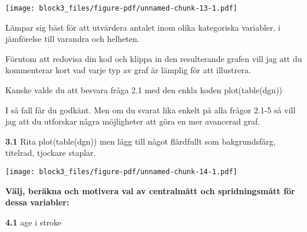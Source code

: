 \documentclass[
  letterpaper,
  DIV=11,
  numbers=noendperiod]{scrartcl}
\newenvironment{Shaded}{\begin{snugshade}}{\end{snugshade}}
\newcommand{\AttributeTok}[1]{\textcolor[rgb]{0.40,0.45,0.13}{#1}}
\newcommand{\CommentTok}[1]{\textcolor[rgb]{0.37,0.37,0.37}{#1}}
\newcommand{\FunctionTok}[1]{\textcolor[rgb]{0.28,0.35,0.67}{#1}}
\newcommand{\NormalTok}[1]{\textcolor[rgb]{0.00,0.23,0.31}{#1}}
\newcommand{\OtherTok}[1]{\textcolor[rgb]{0.00,0.23,0.31}{#1}}
\newcommand{\SpecialCharTok}[1]{\textcolor[rgb]{0.37,0.37,0.37}{#1}}
\newcommand{\StringTok}[1]{\textcolor[rgb]{0.13,0.47,0.30}{#1}}
\begin{document}
\texttt{[image: block3\_files/figure-pdf/unnamed-chunk-13-1.pdf]}

Lämpar sig bäst för att utvärdera antalet inom olika kategoriska
variabler, i jämförelse till varandra och helheten.

Förutom att redovisa din kod och klippa in den resulterande grafen vill
jag att du kommenterar kort vad varje typ av graf är lämplig för att
illustrera.

Kanske valde du att besvara fråga 2.1 med den enkla koden
plot(table(dgn))

I så fall får du godkänt. Men om du svarat lika enkelt på alla frågor
2.1-5 så vill jag att du utforskar några möjligheter att göra en mer
avancerad graf.

\textbf{3.1} Rita plot(table(dgn)) men lägg till något flärdfullt som
bakgrundsfärg, titelrad, tjockare staplar.

\begin{Shaded}
\end{Shaded}

\texttt{[image: block3\_files/figure-pdf/unnamed-chunk-14-1.pdf]}

\textbf{Välj, beräkna och motivera val av centralmått och spridningsmått
för dessa variabler:}

\textbf{4.1} age i stroke
\end{document}
